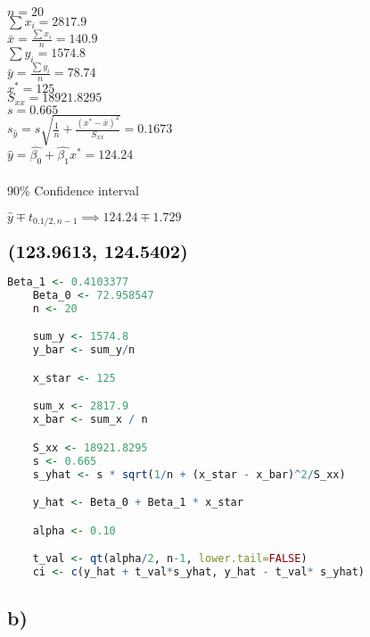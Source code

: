 \documentclass[a4paper,11pt]{article}
\begin{document}
\begin{multicols}{2}
  $n = 20$\\

  $\sum{x_i} = 2817.9$\\
  $\bar{x} = \frac{\sum{x_i}}{n} = 140.9$ \\
  
  $\sum{y_i} = 1574.8$\\
  $\bar{y} = \frac{\sum{y_i}}{n} = 78.74$ \\
  
  $x^* = 125$\\
  
  $S_{xx} = 18921.8295$\\
  $s = 0.665$ \\
  $s_{\hat{y}} = s \sqrt{\frac{1}{n} + \frac{\left(x^*  - \bar{x}\right)^2}{S_{xx}}} = 0.1673 $\\
  
  $\hat{y} = \hat{\beta_0} + \hat{\beta_1} x^* = 124.24$\\ \\
  
  90\% Confidence interval
  
  $\hat{y} \mp t_{0.1/2,n-1} \implies 124.24 \mp 1.729 $\\ \\
  $\textbf{\Large{(123.9613, 124.5402)}}$

\columnbreak
  
  \begin{lstlisting}[language=R]
    Beta_1 <- 0.4103377
    Beta_0 <- 72.958547
    n <- 20

    sum_y <- 1574.8
    y_bar <- sum_y/n

    x_star <- 125

    sum_x <- 2817.9
    x_bar <- sum_x / n

    S_xx <- 18921.8295
    s <- 0.665
    s_yhat <- s * sqrt(1/n + (x_star - x_bar)^2/S_xx)

    y_hat <- Beta_0 + Beta_1 * x_star

    alpha <- 0.10

    t_val <- qt(alpha/2, n-1, lower.tail=FALSE)
    ci <- c(y_hat + t_val*s_yhat, y_hat - t_val* s_yhat)
  \end{lstlisting}

\end{multicols}



\subsection*{b)}
\end{document}
